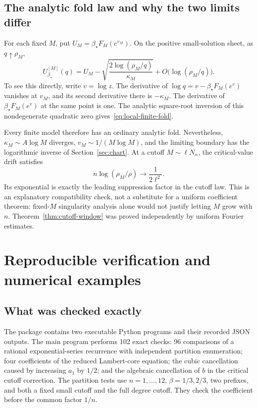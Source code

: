 \documentclass[11pt,a4paper]{article}
\numberwithin{equation}{section}
\theoremstyle{definition}
\theoremstyle{remark}
\newcommand{\bs}{\beta_\star}
\begin{document}
\subsection{The analytic fold law and why the two limits differ}
For each fixed \(M\), put \(U_M=\bs F_M(e^{v_M})\). On the positive
small-solution sheet, as \(q\uparrow\rho_M\),
\begin{equation}
 U_{\bs}^{[M]}(q)=U_M-
 \sqrt{\frac{2\log(\rho_M/q)}{\kappa_M}}
 +O\bigl(\log(\rho_M/q)\bigr).
 \label{eq:local-finite-fold}
\end{equation}
To see this directly, write \(v=\log z\). The derivative of
\(\log q=v-\bs F_M(e^v)\) vanishes at \(v_M\), and its second derivative
there is \(-\kappa_M\). The derivative of \(\bs F_M(e^v)\) at the same
point is one. The analytic square-root inversion of this nondegenerate
quadratic zero gives~\eqref{eq:local-finite-fold}.

Every finite model therefore has an ordinary analytic fold. Nevertheless,
\(\kappa_M\sim A\log M\) diverges, \(v_M\sim1/(M\log M)\), and the
limiting boundary has the logarithmic inverse of Section~\ref{sec:chart}.
At a cutoff \(M\sim\ell N_n\), the critical-value drift satisfies
\begin{equation}
 n\log(\rho_M/\rho)\longrightarrow\frac1{2\ell^2}.
 \label{eq:fold-profile-link}
\end{equation}
Its exponential is exactly the leading suppression factor in the cutoff
law. This is an explanatory compatibility check, not a substitute for a
uniform coefficient theorem: fixed-\(M\) singularity analysis alone would
not justify letting \(M\) grow with \(n\). Theorem~\ref{thm:cutoff-window}
was proved independently by uniform Fourier estimates.

\section{Reproducible verification and numerical examples}
\label{sec:verification}

\subsection{What was checked exactly}
The package contains two executable Python programs and their recorded JSON
outputs. The main program performs 102 exact checks: 96 comparisons of a
rational exponential-series recurrence with independent partition
enumeration; four coefficients of the reduced Lambert-core equation; the
cubic cancellation caused by increasing \(a_1\) by \(1/2\); and the algebraic
cancellation of \(b\) in the critical cutoff correction. The partition tests
use \(n=1,\ldots,12\), \(\beta=1/3,2/3\), two prefixes, and both a fixed
small cutoff and the full degree cutoff. They check the coefficient before
the common factor \(1/n\).
\end{document}
